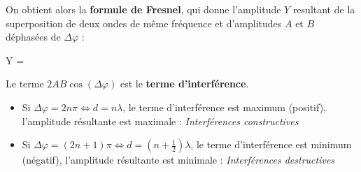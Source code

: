 \documentclass[MPSI]{cours}
\begin{document}
On obtient alors la \textbf{formule de Fresnel}, qui donne l'amplitude $Y$  resultant de la superposition de deux ondes de même fréquence et d'amplitudes $A$ et $B$ déphasées de $\Delta\varphi$  :
\begin{eqencadre}
  Y = 
  \label{eq:fresnel}
\end{eqencadre}

Le terme $2AB\cos(\Delta\varphi)$ est le \textbf{terme d'interférence}.   




\begin{itemize}
  \item Si $\Delta\varphi=2n\pi \Leftrightarrow d=n\lambda$, le terme d'interférence est maximum (positif), l'amplitude résultante est maximale : \emph{Interférences constructives}
  \item  Si $\Delta\varphi=(2n+1)\pi \Leftrightarrow d=\left(n+\frac{1}{2}\right)\lambda$, le terme d'interférence est minimum (négatif), l'amplitude résultante est minimale : \emph{Interférences destructives}
\end{itemize}
\end{document}
